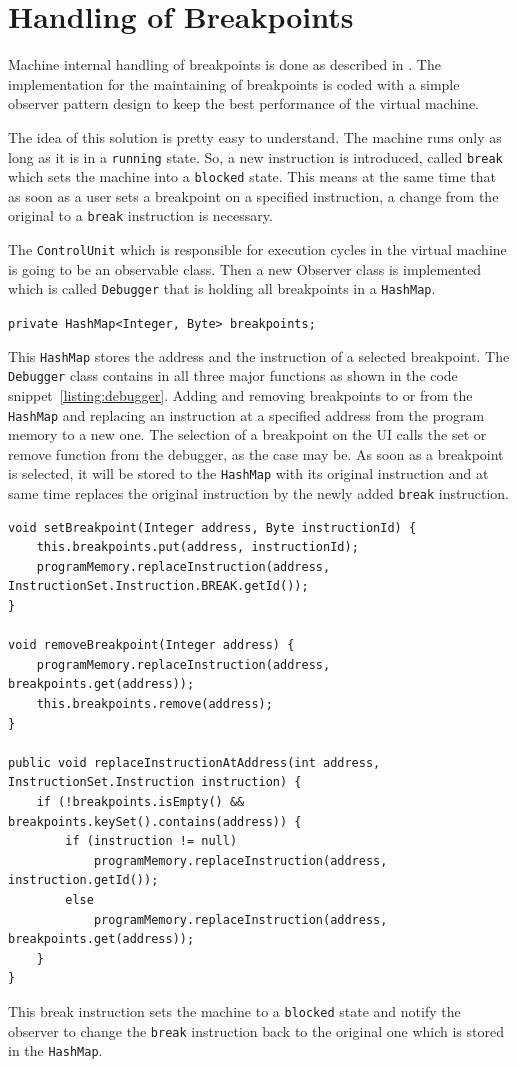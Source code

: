 \section{Handling of Breakpoints}
Machine internal handling of breakpoints is done as described in \cite{bendersky_how_nodate}. The implementation for the maintaining of breakpoints is coded with a simple observer pattern design to keep the best performance of the virtual machine. 

The idea of this solution is pretty easy to understand. The machine runs only as long as it is in a \lstinline$running$ state. So, a new instruction is introduced, called \lstinline$break$ which sets the machine into a \lstinline$blocked$ state. This means at the same time that as soon as a user sets a breakpoint on a specified instruction, a change from the original to a \lstinline$break$ instruction is necessary.

The \lstinline$ControlUnit$ which is responsible for execution cycles in the virtual machine is going to be an observable class. Then a new Observer class is implemented which is called \lstinline$Debugger$ that is holding all breakpoints in a \lstinline$HashMap$.

\lstinline$private HashMap<Integer, Byte> breakpoints;$
 
This \lstinline$HashMap$ stores the address and the instruction of a selected breakpoint. The \lstinline$Debugger$ class contains in all three major functions as shown in the code snippet~\ref{listing:debugger}. Adding and removing breakpoints to or from the \lstinline$HashMap$ and replacing an instruction at a specified address from the program memory to a new one. The selection of a breakpoint on the UI calls the set or remove function from the debugger, as the case may be. As soon as a breakpoint is selected, it will be stored to the \lstinline$HashMap$ with its original instruction and at same time replaces the original instruction by the newly added \lstinline$break$ instruction.
\begin{lstlisting}[caption={Implementation of the debugger},label=listing:debugger]
void setBreakpoint(Integer address, Byte instructionId) {
    this.breakpoints.put(address, instructionId);
    programMemory.replaceInstruction(address, InstructionSet.Instruction.BREAK.getId());
}

void removeBreakpoint(Integer address) {
    programMemory.replaceInstruction(address, breakpoints.get(address));
    this.breakpoints.remove(address);
}

public void replaceInstructionAtAddress(int address, InstructionSet.Instruction instruction) {
    if (!breakpoints.isEmpty() && breakpoints.keySet().contains(address)) {
        if (instruction != null)
            programMemory.replaceInstruction(address, instruction.getId());
        else
            programMemory.replaceInstruction(address, breakpoints.get(address));
    }
}
\end{lstlisting}
This break instruction sets the machine to a \lstinline$blocked$ state and notify the observer to change the \lstinline$break$ instruction back to the original one which is stored in the \lstinline$HashMap$. 

